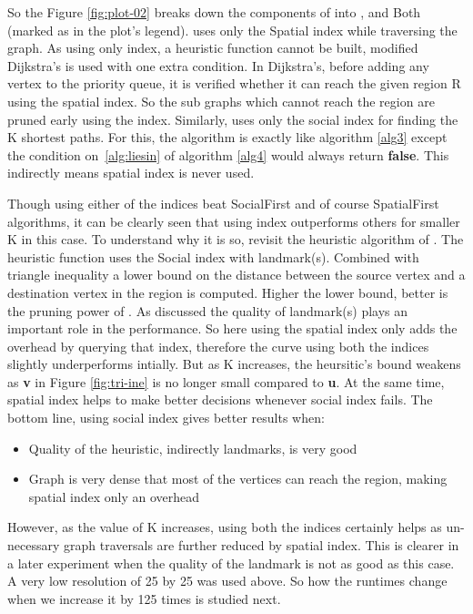 So the Figure \ref{fig:plot-02} breaks down the components of {\rrp} into {\rrpspatial}, {\rrpsocial} and Both (marked as {\rrp} in the plot's legend). {\rrpspatial} uses only the Spatial index while traversing the graph. As using only {\rrpspatial} index, a heuristic function cannot be built, modified Dijkstra's is used with one extra condition. In Dijkstra's, before adding any vertex to the priority queue, it is verified whether it can reach the given region R using the spatial index. So the sub graphs which cannot reach the region are pruned early using the index. Similarly, {\rrpsocial} uses only the social index for finding the K shortest paths. For this, the algorithm is exactly like algorithm \ref{alg3} except the condition on~\ref{alg:liesin} of algorithm \ref{alg4} would always return \textbf{false}. This indirectly means spatial index is never used.

Though using either of the indices beat SocialFirst and of course SpatialFirst algorithms, it can be clearly seen that using {\rrpsocial} index outperforms others for smaller K in this case. To understand why it is so, revisit the heuristic algorithm of {\rrp}. The heuristic function uses the Social index with landmark(s). Combined with triangle inequality a lower bound on the distance between the source vertex and a destination vertex in the region is computed. Higher the lower bound, better is the pruning power of {\rrp}. As discussed the quality of landmark(s) plays an important role in the performance. So here using the spatial index only adds the overhead by querying that index, therefore the curve using both the indices slightly underperforms intially. But as K increases, the heursitic's bound weakens as \textbf{v} in Figure \ref{fig:tri-ine} is no longer small compared to \textbf{u}. At the same time, spatial index helps {\rrp} to make better decisions whenever social index fails. The bottom line, using social index gives better results when:
\begin{itemize}
  \item Quality of the heuristic, indirectly landmarks, is very good
  \item Graph is very dense that most of the vertices can reach the region, making spatial index only an overhead
\end{itemize}

However, as the value of K increases, using both the indices certainly helps as un-necessary graph traversals are further reduced by spatial index. This is clearer in a later experiment when the quality of the landmark is not as good as this case. A very low resolution of 25 by 25 was used above. So how the runtimes change when we increase it by 125 times is studied next.

